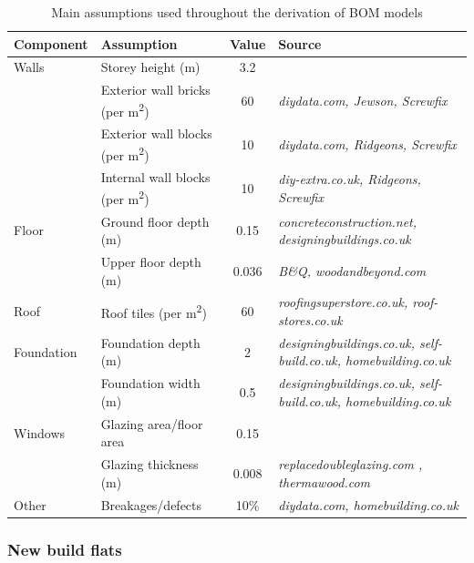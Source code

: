 \documentclass[12pt]{article}
\begin{document}
\begingroup
\linespread{1}
\begin{table}[htbp]
  \centering
  \caption{Main assumptions used throughout the derivation of BOM models}
    \begin{tabular}{l L{0.27\textwidth} c L{0.4\textwidth}}
    \toprule
    \textbf{Component} & \textbf{Assumption} & \textbf{Value} & \textbf{Source} \\
    \midrule
    Walls & Storey height (m) & 3.2   & \textit{\citet{Opdc2018-mp}} \\
          & Exterior wall bricks (per m\textsuperscript{2}) & 60    & \textit{diydata.com, Jewson, Screwfix} \\
          & Exterior wall blocks (per m\textsuperscript{2})  & 10    & \textit{diydata.com, Ridgeons, Screwfix} \\
          & Internal wall blocks  (per m\textsuperscript{2}) & 10   & \textit{diy-extra.co.uk, Ridgeons, Screwfix} \\
    Floor & Ground floor depth (m) & 0.15  & \textit{concreteconstruction.net, designingbuildings.co.uk} \\
          & Upper floor depth (m) & 0.036 & \textit{B\&Q, woodandbeyond.com} \\
    Roof  & Roof tiles (per m\textsuperscript{2}) & 60    & \textit{roofingsuperstore.co.uk, roof-stores.co.uk} \\
    Foundation & Foundation depth (m) & 2     & \textit{designingbuildings.co.uk, self-build.co.uk, homebuilding.co.uk} \\
          & Foundation width (m) & 0.5   & \textit{designingbuildings.co.uk, self-build.co.uk, homebuilding.co.uk} \\
    Windows & Glazing area/floor area & 0.15  & \textit{\citet{US_Environmental_Protection_Agency2012-or}} \\
          & Glazing thickness (m) & 0.008 & \textit{replacedoubleglazing.com \citep{Sanderson_undated-yz}, thermawood.com} \\
    Other & Breakages/defects & 10\%  & \textit{diydata.com, homebuilding.co.uk} \\
    \bottomrule
    \end{tabular}%
  \label{tab:assumptions}%
\end{table}%
\endgroup

\subsubsection{New build flats}
\label{newbuildflats}
\end{document}
